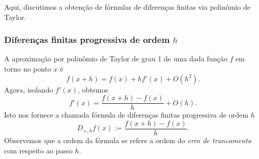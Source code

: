 Aqui, discutimos a obtenção de fórmulas de diferenças finitas via polinômio de Taylor.

\subsubsection{Diferenças finitas progressiva de ordem $h$}

A aproximação por polinômio de Taylor de grau 1 de uma dada função $f$ em torno no ponto $x$ é
\begin{equation}\label{eq:poli_Taylor_grau_1}
  f(x+h) = f(x) + hf'(x) + O(h^2).
\end{equation}
Agora, isolando $f'(x)$, obtemos
\begin{equation}
  f'(x) = \frac{f(x+h) - f(x)}{h} + O(h).
\end{equation}
Isto nos fornece a chamada fórmula de diferenças finitas progressiva de ordem $h$
\begin{equation}\label{eq:dfp_h}
  D_{+,h}f(x) := \frac{f(x+h) - f(x)}{h}.
\end{equation}
Observemos que a ordem da fórmula se refere a ordem do \emph{erro de truncamento} com respeito ao passo $h$.

